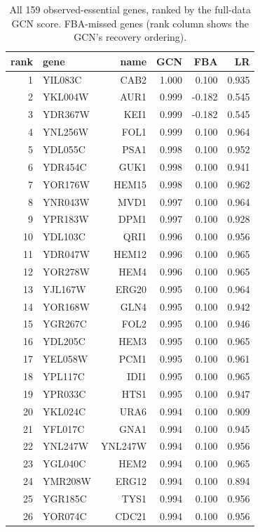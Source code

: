 \begin{longtable}{rlrrrr}
\caption{All 159 observed-essential genes, ranked by the full-data GCN score. FBA-missed genes (rank column shows the GCN's recovery ordering).}\label{tab:essentials}\\
\hline\hline
rank & gene & name & GCN & FBA & LR\\
\hline
1 & YIL083C & CAB2 & 1.000 & 0.100 & 0.935\\
2 & YKL004W & AUR1 & 0.999 & -0.182 & 0.545\\
3 & YDR367W & KEI1 & 0.999 & -0.182 & 0.545\\
4 & YNL256W & FOL1 & 0.999 & 0.100 & 0.964\\
5 & YDL055C & PSA1 & 0.998 & 0.100 & 0.952\\
6 & YDR454C & GUK1 & 0.998 & 0.100 & 0.941\\
7 & YOR176W & HEM15 & 0.998 & 0.100 & 0.962\\
8 & YNR043W & MVD1 & 0.997 & 0.100 & 0.964\\
9 & YPR183W & DPM1 & 0.997 & 0.100 & 0.928\\
10 & YDL103C & QRI1 & 0.996 & 0.100 & 0.956\\
11 & YDR047W & HEM12 & 0.996 & 0.100 & 0.965\\
12 & YOR278W & HEM4 & 0.996 & 0.100 & 0.965\\
13 & YJL167W & ERG20 & 0.995 & 0.100 & 0.964\\
14 & YOR168W & GLN4 & 0.995 & 0.100 & 0.942\\
15 & YGR267C & FOL2 & 0.995 & 0.100 & 0.946\\
16 & YDL205C & HEM3 & 0.995 & 0.100 & 0.965\\
17 & YEL058W & PCM1 & 0.995 & 0.100 & 0.961\\
18 & YPL117C & IDI1 & 0.995 & 0.100 & 0.965\\
19 & YPR033C & HTS1 & 0.995 & 0.100 & 0.947\\
20 & YKL024C & URA6 & 0.994 & 0.100 & 0.909\\
21 & YFL017C & GNA1 & 0.994 & 0.100 & 0.945\\
22 & YNL247W & YNL247W & 0.994 & 0.100 & 0.956\\
23 & YGL040C & HEM2 & 0.994 & 0.100 & 0.965\\
24 & YMR208W & ERG12 & 0.994 & 0.100 & 0.894\\
25 & YGR185C & TYS1 & 0.994 & 0.100 & 0.956\\
26 & YOR074C & CDC21 & 0.994 & 0.100 & 0.956\\

\end{longtable}

